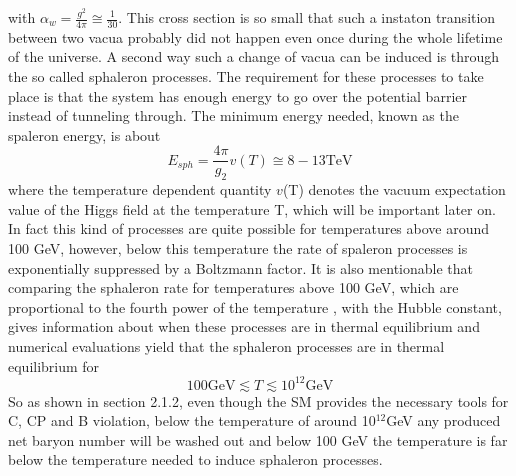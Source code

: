 with $\alpha_w=\frac{g^2}{4\pi}\cong\frac{1}{30}$.
This cross section is so small that such a instaton transition between two vacua probably did not happen even once during the whole lifetime of the universe. \newline
A second way such a change of vacua can be induced is through the so called sphaleron processes. The requirement for these processes to take place is that the system has enough energy to go over the potential barrier instead of tunneling through. The minimum energy needed, known as the spaleron energy, is about\cite{Bernreuther:2002uj,Cline:2006ts}
\begin{equation}
	E_{sph}=\frac{4\pi}{g_2}v(T)\cong8-13\text{TeV}
	\label{spaleron}
\end{equation} 
where the temperature dependent quantity $v$(T) denotes the vacuum expectation value of the Higgs field at the temperature T, which will be important later on.\newline
In fact this kind of processes are quite possible for temperatures above around 100 GeV, however, below this temperature the rate of spaleron processes is exponentially suppressed by a Boltzmann factor. It is also mentionable that comparing the sphaleron rate for temperatures above 100 GeV, which are proportional to the fourth power of the temperature \cite[p. 19]{Bernreuther:2002uj}, with the Hubble constant, gives information about when these processes are in thermal equilibrium and numerical evaluations yield that the sphaleron processes are in thermal equilibrium for
\begin{equation*}
100\text{GeV}\lesssim T \lesssim 10^{12}\text{GeV}
\end{equation*}
So as shown in section 2.1.2, even though the SM provides the necessary tools for C, CP and B violation, below the temperature of around 10$^{12}$GeV any produced net baryon number will be washed out and below 100 GeV the temperature is far below the temperature needed to induce sphaleron processes. \newline
